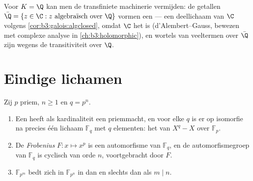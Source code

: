 \begin{remark}\label{rem:b3:galois:closureexamples}
Voor $K = \Q$ kan men de transfiniete machinerie vermijden: de
 getallen $\bar\Q = \{z \in \C : z \text{ algebraïsch
over } \Q\}$ vormen een  --- een
deellichaam van $\C$ volgens \cref{cor:b3:galois:algclosed},
 omdat $\C$ het is (d'Alembert--Gauss,
bewezen met complexe analyse in \cref{ch:b3:holomorphic}), en
wortels van veeltermen over $\bar\Q$ zijn wegens de
transitiviteit  over $\Q$.
\end{remark}

\section{Eindige lichamen}

\begin{theorem}\label{thm:b3:galois:finitefields}
Zij $p$ priem, $n \geq 1$ en $q = p^n$.
\begin{enumerate}
  \item Een  heeft als kardinaliteit een
        priemmacht, en voor elke $q$ is er op isomorfie na precies
        één lichaam $\mathbb F_q$ met $q$ elementen: het
         van $X^q - X$ over $\mathbb
        F_p$.
  \item De \emph{Frobenius} $F \colon
        x \mapsto x^p$ is een automorfisme van $\mathbb F_q$, en
        de automorfismegroep van $\mathbb F_q$ is cyclisch van
        orde $n$, voortgebracht door $F$.
  \item $\mathbb F_{p^m}$ bedt zich in $\mathbb F_{p^n}$ in dan en
        slechts dan als $m \mid n$.
\end{enumerate}
\end{theorem}

